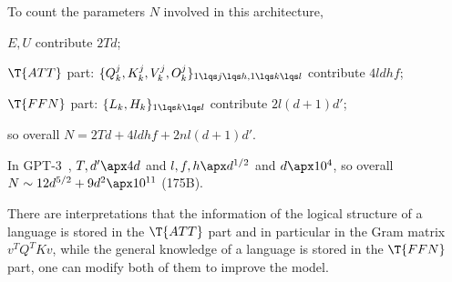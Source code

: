 \documentclass[article, a4paper, twoside]{universal}
\begin{document}
\begin{rmk}
    To count the parameters $N$ involved in this architecture,
    \begin{itm}
        \item $E,U$ contribute $2Td$;
        \item $\T{ATT}$ part: $\{Q_{k}^{j},K_{k}^{j},V_{k}^{j},O_{k}^{j}\}_{1\lqs j\lqs h, 1\lqs k\lqs l}$ contribute $4ldhf$;
        \item $\T{FFN}$ part: $\{L_{k},H_{k}\}_{1\lqs k\lqs l}$ contribute $2l(d+1)d'$;
    \end{itm}
    so overall $N=2Td+4ldhf+2nl(d+1)d'$.

    In GPT-3~\cite{GPT3-2020}, $T,d'\apx 4d$ and $l,f,h\apx d^{1/2}$ and $d\apx 10^{4}$, so overall $N\sim12d^{5/2}+9d^{2}\apx 10^{11}$ (175B).
\end{rmk}

\begin{rmk}
    There are interpretations that the information of the logical structure of a language is stored in the $\T{ATT}$ part and in particular in the Gram matrix $v^{T}Q^{T}Kv$, while the general knowledge of a language is stored in the $\T{FFN}$ part, one can modify both of them to improve the model.
\end{rmk}
\end{document}
